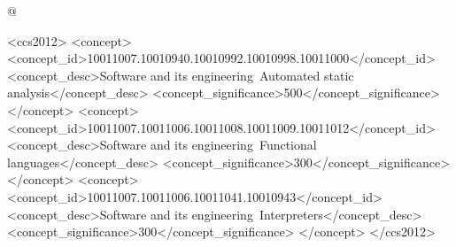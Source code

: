 \documentclass[acmsmall, screen]{acmart}\settopmatter{}
\begin{document}
\lstMakeShortInline[keywordstyle=,%
                    flexiblecolumns=false,%
                    mathescape=false,%
                    basicstyle=\tt]@

\begin{abstract}
  
\end{abstract}


\begin{CCSXML}
<ccs2012>
<concept>
<concept_id>10011007.10010940.10010992.10010998.10011000</concept_id>
<concept_desc>Software and its engineering~Automated static analysis</concept_desc>
<concept_significance>500</concept_significance>
</concept>
<concept>
<concept_id>10011007.10011006.10011008.10011009.10011012</concept_id>
<concept_desc>Software and its engineering~Functional languages</concept_desc>
<concept_significance>300</concept_significance>
</concept>
<concept>
<concept_id>10011007.10011006.10011041.10010943</concept_id>
<concept_desc>Software and its engineering~Interpreters</concept_desc>
<concept_significance>300</concept_significance>
</concept>
</ccs2012>
\end{CCSXML}





\maketitle
\end{document}
